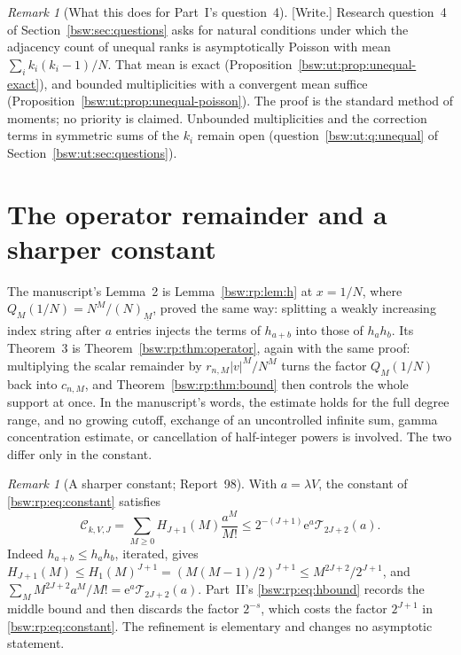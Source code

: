 \documentclass[11pt,letterpaper]{article}
\theoremstyle{definition}
\theoremstyle{remark}
\newtheorem{remark}[theorem]{Remark}
\newcommand{\ee}{\mathrm e}
\newcommand{\fall}[2]{(#1)_{\underline{#2}}}
\begin{document}
\begin{remark}[What this does for Part~I's question~4]
\label{bsw:ut:rem:unequal-scope}
[Write.]  Research question~4 of Section~\ref{bsw:sec:questions} asks for
natural conditions under which the adjacency count of unequal ranks is
asymptotically Poisson with mean $\sum_ik_i(k_i-1)/N$.  That mean is exact
(Proposition~\ref{bsw:ut:prop:unequal-exact}), and bounded multiplicities
with a convergent mean suffice
(Proposition~\ref{bsw:ut:prop:unequal-poisson}).  The proof is the
standard method of moments; no priority is claimed.  Unbounded
multiplicities and the correction terms in symmetric sums of the $k_i$
remain open (question~\ref{bsw:ut:q:unequal} of
Section~\ref{bsw:ut:sec:questions}).
\end{remark}

\section{The operator remainder and a sharper constant}
\label{bsw:ut:sec:operator}

The manuscript's Lemma~2 is Lemma~\ref{bsw:rp:lem:h} at $x=1/N$, where
$Q_M(1/N)=N^M/\fall NM$, proved the same way: splitting a weakly
increasing index string after $a$ entries injects the terms of $h_{a+b}$
into those of $h_ah_b$.  Its Theorem~3 is
Theorem~\ref{bsw:rp:thm:operator}, again with the same proof: multiplying
the scalar remainder by $r_{n,M}|v|^M/N^M$ turns the factor $Q_M(1/N)$ back
into $c_{n,M}$, and Theorem~\ref{bsw:rp:thm:bound} then controls the whole
support at once.  In the manuscript's words, the estimate holds for the
full degree range, and no growing cutoff, exchange of an uncontrolled
infinite sum, gamma concentration estimate, or cancellation of half-integer
powers is involved.  The two differ only in the constant.

\begin{remark}[A sharper constant; Report~98]\label{bsw:ut:rem:constant}
With $a=\lambda V$, the constant of \eqref{bsw:rp:eq:constant} satisfies
\begin{equation}\label{bsw:ut:eq:C}
 \mathcal C_{k,V,J}=\sum_{M\ge0}H_{J+1}(M)\frac{a^M}{M!}
 \le2^{-(J+1)}\ee^a\mathcal T_{2J+2}(a).
\end{equation}
Indeed $h_{a+b}\le h_ah_b$, iterated, gives
$H_{J+1}(M)\le H_1(M)^{J+1}=(M(M-1)/2)^{J+1}\le M^{2J+2}/2^{J+1}$, and
$\sum_MM^{2J+2}a^M/M!=\ee^a\mathcal T_{2J+2}(a)$.  Part~II's
\eqref{bsw:rp:eq:hbound} records the middle bound and then discards the
factor $2^{-s}$, which costs the factor $2^{J+1}$ in
\eqref{bsw:rp:eq:constant}.  The refinement is elementary and changes no
asymptotic statement.
\end{remark}
\end{document}
